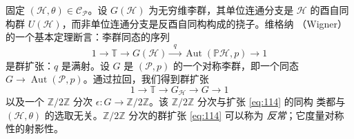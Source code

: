 \documentclass[11pt]{amsart}
\theoremstyle{definition}
\theoremstyle{remark}
\theoremstyle{plain}
\numberwithin{equation}{section}
\renewcommand{\:}{\colon}
\DeclareMathOperator{\Aut}{Aut}
\newcommand{\PP}{{\mathbb P}}
\newcommand{\TT}{\mathbb T}
\newcommand{\ZZ}{{\mathbb Z}}
\newcommand{\zmod}[1]{\ZZ/#1\ZZ}
\newcommand{\zt}{\zmod2}
\newcommand{\PH}{\PP\sH}
\newcommand{\cP}{\sC_{\sP}}
\newcommand{\sC}{\mathscr{C}}
\newcommand{\sH}{\mathscr{H}}
\newcommand{\sP}{\mathscr{P}}
\begin{document}
固定 $(\sH,\theta )\in \cP$。设 $G(\sH)$ 为无穷维李群，其单位连通分支是 $\sH$
的酉自同构群 $U(\sH)$，而非单位连通分支是反酉自同构构成的挠子。维格纳
（Wigner）的一个基本定理断言：李群同态的序列
  \begin{equation}\label{eq:113}
     1\longrightarrow \TT\longrightarrow
     G(\sH)\xrightarrow{\;\;q\;\;}\Aut(\PH,p)\longrightarrow 1 
  \end{equation}
是群扩张：$q$ 是满射。设 $G$ 是 $(\sP,p)$ 的一个对称李群，即一个同态
$G\to \Aut(\sP,p)$。通过拉回，我们得到群扩张
  \begin{equation}\label{eq:114}
     1\longrightarrow \TT\longrightarrow G_{\sH}\longrightarrow G\longrightarrow
     1 
  \end{equation}
以及一个 $\zt$ 分次 $\epsilon \:G\to \zt$。该 $\zt$ 分次与扩张 \eqref{eq:114} 的同构
类都与 $(\sH,\theta )$ 的选取无关。$\zt$ 分次的群扩张 \eqref{eq:114} 可以称为
\emph{反常}；它度量对称性的射影性。
\end{document}
